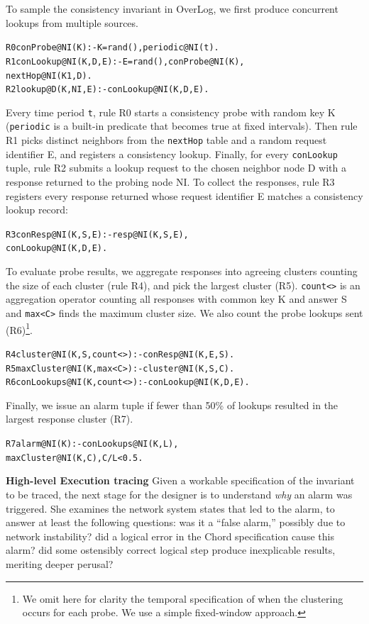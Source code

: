 \documentclass[10pt,twocolumn]{article}
\def\Lang{OverLog\xspace}
\newenvironment{overlog}{\begin{alltt}\footnotesize}{\end{alltt}}
\newcommand{\ol}[1]{{\tt\footnotesize#1}}
\begin{document}
To sample the consistency invariant in \Lang, we first produce concurrent
lookups from multiple sources.
\begin{overlog}
R0 conProbe@NI(K) :- K=rand(),periodic@NI(t).
R1 conLookup@NI(K,D,E) :- E=rand(),conProbe@NI(K),
     nextHop@NI(K1,D).
R2 lookup@D(K,NI,E)  :- conLookup@NI(K,D,E).
\end{overlog}
Every time period \ol{t}, rule R0 starts a consistency probe with random key
K (\ol{periodic} is a built-in predicate that becomes true at fixed
intervals).  Then rule R1 picks distinct neighbors from the \ol{nextHop}
table and a random request identifier E, and registers a consistency
lookup.  Finally, for every \ol{conLookup} tuple,
rule R2 submits a lookup request to the chosen neighbor node D with a
response returned to the probing node NI.
To collect the responses, rule R3 
registers every response returned whose request
identifier E matches a consistency lookup record:
\begin{overlog}
R3 conResp@NI(K,S,E) :- resp@NI(K,S,E),
     conLookup@NI(K,D,E).
\end{overlog}

To evaluate probe results, we aggregate responses into agreeing
clusters counting the size of each cluster (rule R4), and pick the
largest cluster (R5).  \ol{count<>} is an aggregation operator
counting all responses with common key K and answer S and \ol{max<C>}
finds the maximum cluster size. We also count the probe lookups sent
(R6)\footnote{We omit here for clarity the temporal specification of
  when the clustering occurs for each probe. We use a simple
  fixed-window approach.}.
\begin{overlog}
R4 cluster@NI(K,S,count<>) :- conResp@NI(K,E,S).
R5 maxCluster@NI(K,max<C>) :- cluster@NI(K,S,C).
R6 conLookups@NI(K,count<>) :- conLookup@NI(K,D,E).
\end{overlog}
Finally, we issue an alarm tuple if fewer than 50\% of lookups
resulted in the largest response cluster (R7).
\begin{overlog}
R7 alarm@NI(K) :- conLookups@NI(K,L),
     maxCluster@NI(K,C),C/L<0.5.
\end{overlog}

{\bf High-level Execution tracing}
Given a workable specification of the invariant to be traced,
the next stage for the designer is to understand \emph{why} an alarm
was triggered. She examines the network system states that led to
the alarm, to answer at least the following questions: was it a ``false
alarm,'' possibly due to network instability? did a logical error in the
Chord specification cause this alarm? did some ostensibly correct
logical step produce inexplicable results, meriting deeper perusal?
\end{document}
